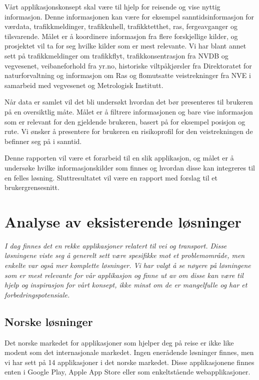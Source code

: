 \documentclass[a4paper,norsk,oneside]{book}
\begin{document}
Vårt applikasjonskonsept skal være til hjelp for reisende og vise nyttig informasjon.  Denne informasjonen kan være for eksempel sanntidsinformasjon for værdata, trafikkmeldinger, trafikkuhell, trafikktetthet, ras, fergeavganger og tilsvarende. Målet er å koordinere informasjon fra flere forskjellige kilder, og prosjektet vil ta for seg hvilke kilder som er mest relevante. Vi har blant annet sett på trafikkmeldinger om trafikkflyt,  trafikkonsentrasjon fra NVDB og vegvesenet, veibaneforhold fra yr.no, historiske viltpåkjørsler fra Direktoratet for naturforvaltning og informasjon om Ras og flomutsatte veistrekninger fra NVE i samarbeid med vegvesenet og Metrologisk Institutt.
	
Når data er samlet vil det bli undersøkt hvordan det bør presenteres til brukeren på en oversiktlig måte. Målet er å filtrere informasjonen og bare vise informasjon som er relevant for den gjeldende brukeren, basert på for eksempel posisjon og rute. Vi ønsker å presentere for brukeren en risikoprofil for den veistrekningen de befinner seg på i sanntid.

Denne rapporten vil være et forarbeid til en slik applikasjon, og målet er å undersøke hvilke informasjonskilder som finnes og hvordan disse kan integreres til en felles løsning. Sluttresultatet vil være en rapport med forslag til et brukergrensesnitt.

\chapter{ Analyse av eksisterende løsninger}\label{T-B}
\label{cha:TheoryAndBackground}

{\it I dag finnes det en rekke applikasjoner relatert til vei og transport. Disse løsningene viste seg å generelt sett være spesifikke mot et problemområde, men enkelte var også mer komplette løsninger. Vi har valgt å se nøyere på løsningene som er mest relevante for vår applikasjon og finne ut av om disse kan være til hjelp og inspirasjon for vårt konsept, ikke minst om de er mangelfulle og har et forbedringspotensiale.}


\section{Norske løsninger}
\label{sec:no1}

Det norske markedet for applikasjoner som hjelper deg på reise er ikke like modent som det internasjonale markedet. Ingen enerådende løsninger finnes, men vi har sett på 14 applikasjoner i det norske markedet. Disse applikasjonene finnes enten i Google Play, Apple App Store eller som enkeltstående webapplikasjoner.
\end{document}
